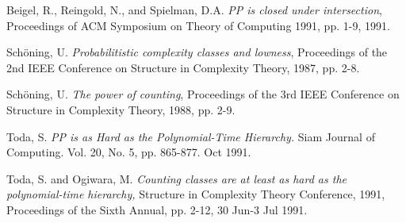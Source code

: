 \documentclass[11pt]{article}
\begin{document}
\begin{thebibliography}{9}

 Beigel, R., Reingold, N., and Spielman, D.A. \emph{PP is closed under intersection}, Proceedings of ACM Symposium on Theory of Computing 1991, pp. 1-9, 1991.

 Sch\"oning, U. \emph{Probabilitistic complexity classes and lowness}, Proceedings of the 2nd IEEE Conference on Structure in Complexity Theory, 1987, pp. 2-8.

 Sch\"oning, U. \emph{The power of counting}, Proceedings of the 3rd IEEE Conference on Structure in Complexity Theory, 1988, pp. 2-9.

Toda, S. \emph{PP is as Hard as the Polynomial-Time Hierarchy.} Siam Journal of Computing. Vol. 20, No. 5, pp. 865-877. Oct 1991.

 Toda, S. and Ogiwara, M. \emph{Counting classes are at least as hard as the polynomial-time hierarchy,} Structure in Complexity Theory Conference, 1991, Proceedings of the Sixth Annual, pp. 2-12, 30 Jun-3 Jul 1991.

\end{thebibliography}
\end{document}
